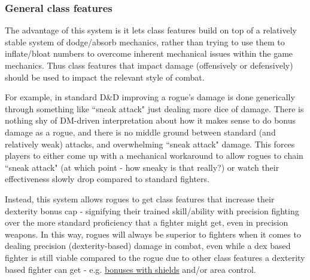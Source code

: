 \documentclass{article}
\begin{document}
            
        \subsubsection{General class features}
            The advantage of this system is it lets class features build on top of a relatively stable system of dodge/absorb mechanics, rather than trying to use them to inflate/bloat numbers to overcome inherent mechanical issues within the game mechanics. Thus class features that impact damage (offensively or defensively) should be used to impact the relevant style of combat.
            
            For example, in standard D\&D improving a rogue's damage is done generically through something like ``sneak attack" just dealing more dice of damage. There is nothing shy of DM-driven interpretation about how it makes sense to do bonus damage as a rogue, and there is no middle ground between standard (and relatively weak) attacks, and overwhelming ``sneak attack" damage. This forces players to either come up with a mechanical workaround to allow rogues to chain ``sneak attack" (at which point - how sneaky is that really?) or watch their effectiveness slowly drop compared to standard fighters.
            
            Instead, this system allows rogues to get class features that increase their dexterity bonus cap - signifying their trained skill/ability with precision fighting over the more standard proficiency that a fighter might get, even in precision weapons. In this way, rogues will always be superior to fighters when it comes to dealing precision (dexterity-based) damage in combat, even while a dex based fighter is still viable compared to the rogue due to other class features a dexterity based fighter can get - e.g. \hyperref[subsec:shields]{bonuses with shields} and/or area control.
            
\end{document}
